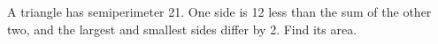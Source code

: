A triangle has semiperimeter 21. One side is 12 less than the sum of the other two, and the largest and smallest sides differ by 2. Find its area.
